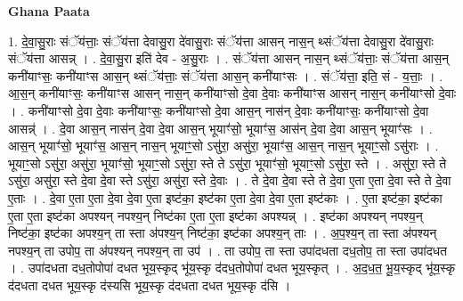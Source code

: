 \documentclass[17pt]{extarticle}
\begin{document}
\textbf{Ghana Paata } \newline

1. दे॒वा॒सु॒राः संॅय॑त्ताः॒ संॅय॑त्ता देवासु॒रा दे॑वासु॒राः संॅय॑त्ता आसन् नास॒न् थ्संॅय॑त्ता देवासु॒रा दे॑वासु॒राः संॅय॑त्ता आसन्न् । . दे॒वा॒सु॒रा इति॑ देव - अ॒सु॒राः । . संॅय॑त्ता आसन् नास॒न् थ्संॅय॑त्ताः॒ संॅय॑त्ता आस॒न् कनी॑याꣳसः॒ कनी॑याꣳस आस॒न् थ्संॅय॑त्ताः॒ संॅय॑त्ता आस॒न् कनी॑याꣳसः । . संॅय॑त्ता॒ इति॒ सं - य॒त्ताः॒ । . आ॒स॒न् कनी॑याꣳसः॒ कनी॑याꣳस आसन् नास॒न् कनी॑याꣳसो दे॒वा दे॒वाः कनी॑याꣳस आसन् नास॒न् कनी॑याꣳसो दे॒वाः । . कनी॑याꣳसो दे॒वा दे॒वाः कनी॑याꣳसः॒ कनी॑याꣳसो दे॒वा आस॒न् नास॑न् दे॒वाः कनी॑याꣳसः॒ कनी॑याꣳसो दे॒वा आसन्न्॑ । . दे॒वा आस॒न् नास॑न् दे॒वा दे॒वा आस॒न् भूयाꣳ॑सो॒ भूयाꣳ॑स॒ आस॑न् दे॒वा दे॒वा आस॒न् भूयाꣳ॑सः । . आस॒न् भूयाꣳ॑सो॒ भूयाꣳ॑स॒ आस॒न् नास॒न् भूयाꣳ॒॒सो ऽसु॑रा॒ असु॑रा॒ भूयाꣳ॑स॒ आस॒न् नास॒न् भूयाꣳ॒॒सो ऽसु॑राः । . भूयाꣳ॒॒सो ऽसु॑रा॒ असु॑रा॒ भूयाꣳ॑सो॒ भूयाꣳ॒॒सो ऽसु॑रा॒ स्ते ते ऽसु॑रा॒ भूयाꣳ॑सो॒ भूयाꣳ॒॒सो ऽसु॑रा॒ स्ते । . असु॑रा॒ स्ते ते ऽसु॑रा॒ असु॑रा॒ स्ते दे॒वा दे॒वा स्ते ऽसु॑रा॒ असु॑रा॒ स्ते दे॒वाः । . ते दे॒वा दे॒वा स्ते ते दे॒वा ए॒ता ए॒ता दे॒वा स्ते ते दे॒वा ए॒ताः । . दे॒वा ए॒ता ए॒ता दे॒वा दे॒वा ए॒ता इष्ट॑का॒ इष्ट॑का ए॒ता दे॒वा दे॒वा ए॒ता इष्ट॑काः । . ए॒ता इष्ट॑का॒ इष्ट॑का ए॒ता ए॒ता इष्ट॑का अपश्यन् नपश्य॒न् निष्ट॑का ए॒ता ए॒ता इष्ट॑का अपश्यन्न् । . इष्ट॑का अपश्यन् नपश्य॒न् निष्ट॑का॒ इष्ट॑का अपश्य॒न् ता स्ता अ॑पश्य॒न् निष्ट॑का॒ इष्ट॑का अपश्य॒न् ताः । . अ॒प॒श्य॒न् ता स्ता अ॑पश्यन् नपश्य॒न् ता उपोप॒ ता अ॑पश्यन् नपश्य॒न् ता उप॑ । . ता उपोप॒ ता स्ता उपा॑दधता दध॒तोप॒ ता स्ता उपा॑दधत । . उपा॑दधता दध॒तोपोपा॑ दधत भूय॒स्कृद् भू॑य॒स्कृ द॑दध॒तोपोपा॑ दधत भूय॒स्कृत् । . अ॒द॒ध॒त॒ भू॒य॒स्कृद् भू॑य॒स्कृ द॑दधता दधत भूय॒स्कृ द॑स्यसि भूय॒स्कृ द॑दधता दधत भूय॒स्कृ द॑सि । \newline
\end{document}
